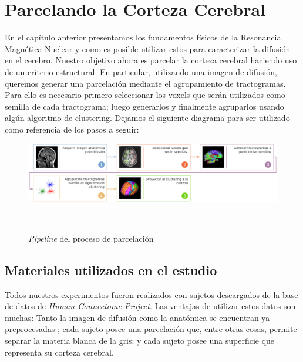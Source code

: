 \chapter{Parcelando la Corteza Cerebral}

En el cap\'itulo anterior presentamos los fundamentos f\'isicos de la Resonancia
Magn\'etica Nuclear y como es posible utilizar estos para caracterizar la 
difusi\'on en el cerebro. Nuestro objetivo ahora es parcelar la corteza cerebral
haciendo uso de un criterio estructural. En particular, utilizando una imagen de
difusi\'on, queremos generar una parcelaci\'on mediante el agrupamiento de
tractogramas. Para ello es necesario primero seleccionar los voxels que ser\'an
utilizados como semilla de cada tractograma; luego generarlos y finalmente 
agruparlos usando alg\'un algoritmo de clustering. Dejamos el siguiente diagrama
para ser utilizado como referencia de los pasos a seguir: \\

\begin{figure}[h!]

\centering
\begin{minipage}[b]{\textwidth}
    \includegraphics[width=\textwidth]{img/diagrama.png}
    \caption{\small \textit{Pipeline} del proceso de parcelaci\'on }
    \label{fig:diagrama}
\end{minipage} ~

\end{figure}  

\section{Materiales utilizados en el estudio}

Todos nuestros experimentos fueron realizados con sujetos descargados de la base
de datos de \textit{Human Connectome Project}. Las ventajas de utilizar estos
datos son muchas: Tanto la imagen de difusi\'on como la anat\'omica se encuentran
ya preprocesadas \cite{Glasser2013}; cada sujeto posee una parcelaci\'on que, entre
otras cosas, permite separar la materia blanca de la gris; y cada sujeto posee una
superficie que representa su corteza cerebral.\\






